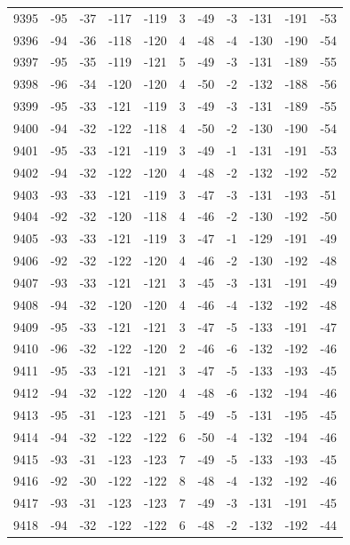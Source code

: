 \begin{table}[H]
\begin{tabular}{lllllllllll}
9395 & -95 & -37 & -117 & -119 & 3 & -49 & -3 & -131 & -191 & -53 \\
9396 & -94 & -36 & -118 & -120 & 4 & -48 & -4 & -130 & -190 & -54 \\
9397 & -95 & -35 & -119 & -121 & 5 & -49 & -3 & -131 & -189 & -55 \\
9398 & -96 & -34 & -120 & -120 & 4 & -50 & -2 & -132 & -188 & -56 \\
9399 & -95 & -33 & -121 & -119 & 3 & -49 & -3 & -131 & -189 & -55 \\
9400 & -94 & -32 & -122 & -118 & 4 & -50 & -2 & -130 & -190 & -54 \\
9401 & -95 & -33 & -121 & -119 & 3 & -49 & -1 & -131 & -191 & -53 \\
9402 & -94 & -32 & -122 & -120 & 4 & -48 & -2 & -132 & -192 & -52 \\
9403 & -93 & -33 & -121 & -119 & 3 & -47 & -3 & -131 & -193 & -51 \\
9404 & -92 & -32 & -120 & -118 & 4 & -46 & -2 & -130 & -192 & -50 \\
9405 & -93 & -33 & -121 & -119 & 3 & -47 & -1 & -129 & -191 & -49 \\
9406 & -92 & -32 & -122 & -120 & 4 & -46 & -2 & -130 & -192 & -48 \\
9407 & -93 & -33 & -121 & -121 & 3 & -45 & -3 & -131 & -191 & -49 \\
9408 & -94 & -32 & -120 & -120 & 4 & -46 & -4 & -132 & -192 & -48 \\
9409 & -95 & -33 & -121 & -121 & 3 & -47 & -5 & -133 & -191 & -47 \\
9410 & -96 & -32 & -122 & -120 & 2 & -46 & -6 & -132 & -192 & -46 \\
9411 & -95 & -33 & -121 & -121 & 3 & -47 & -5 & -133 & -193 & -45 \\
9412 & -94 & -32 & -122 & -120 & 4 & -48 & -6 & -132 & -194 & -46 \\
9413 & -95 & -31 & -123 & -121 & 5 & -49 & -5 & -131 & -195 & -45 \\
9414 & -94 & -32 & -122 & -122 & 6 & -50 & -4 & -132 & -194 & -46 \\
9415 & -93 & -31 & -123 & -123 & 7 & -49 & -5 & -133 & -193 & -45 \\
9416 & -92 & -30 & -122 & -122 & 8 & -48 & -4 & -132 & -192 & -46 \\
9417 & -93 & -31 & -123 & -123 & 7 & -49 & -3 & -131 & -191 & -45 \\
9418 & -94 & -32 & -122 & -122 & 6 & -48 & -2 & -132 & -192 & -44 \\

\end{tabular}
\end{table}
